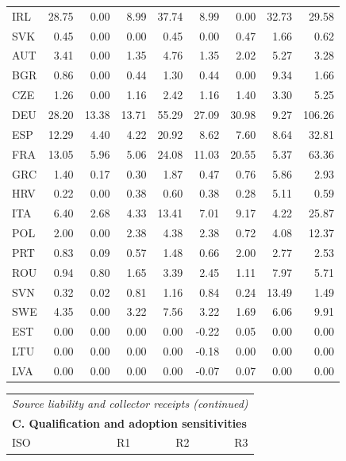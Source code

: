 {\begin{longtable}{@{}lrrrrrrrr@{}}
IRL & 28.75 &  0.00 &  8.99 & 37.74 &  8.99 &  0.00 &  32.73 &  29.58 \\
SVK &  0.45 &  0.00 &  0.00 &  0.45 &  0.00 &  0.47 &   1.66 &   0.62 \\
AUT &  3.41 &  0.00 &  1.35 &  4.76 &  1.35 &  2.02 &   5.27 &   3.28 \\
BGR &  0.86 &  0.00 &  0.44 &  1.30 &  0.44 &  0.00 &   9.34 &   1.66 \\
CZE &  1.26 &  0.00 &  1.16 &  2.42 &  1.16 &  1.40 &   3.30 &   5.25 \\
DEU & 28.20 & 13.38 & 13.71 & 55.29 & 27.09 & 30.98 &   9.27 & 106.26 \\
ESP & 12.29 &  4.40 &  4.22 & 20.92 &  8.62 &  7.60 &   8.64 &  32.81 \\
FRA & 13.05 &  5.96 &  5.06 & 24.08 & 11.03 & 20.55 &   5.37 &  63.36 \\
GRC &  1.40 &  0.17 &  0.30 &  1.87 &  0.47 &  0.76 &   5.86 &   2.93 \\
HRV &  0.22 &  0.00 &  0.38 &  0.60 &  0.38 &  0.28 &   5.11 &   0.59 \\
ITA &  6.40 &  2.68 &  4.33 & 13.41 &  7.01 &  9.17 &   4.22 &  25.87 \\
POL &  2.00 &  0.00 &  2.38 &  4.38 &  2.38 &  0.72 &   4.08 &  12.37 \\
PRT &  0.83 &  0.09 &  0.57 &  1.48 &  0.66 &  2.00 &   2.77 &   2.53 \\
ROU &  0.94 &  0.80 &  1.65 &  3.39 &  2.45 &  1.11 &   7.97 &   5.71 \\
SVN &  0.32 &  0.02 &  0.81 &  1.16 &  0.84 &  0.24 &  13.49 &   1.49 \\
SWE &  4.35 &  0.00 &  3.22 &  7.56 &  3.22 &  1.69 &   6.06 &   9.91 \\
EST &  0.00 &  0.00 &  0.00 &  0.00 & -0.22 &  0.05 &   0.00 &   0.00 \\
LTU &  0.00 &  0.00 &  0.00 &  0.00 & -0.18 &  0.00 &   0.00 &   0.00 \\
LVA &  0.00 &  0.00 &  0.00 &  0.00 & -0.07 &  0.07 &   0.00 &   0.00 \\
\end{longtable}
\addtocounter{table}{-1}
\begin{longtable}{@{}lrrr@{}}
\multicolumn{4}{l}{\textit{Source liability and collector receipts (continued)}} \\
\multicolumn{4}{l}{\textbf{C. Qualification and adoption sensitivities}} \\
\toprule
ISO & R1 & R2 & R3 \\

\end{longtable}}
